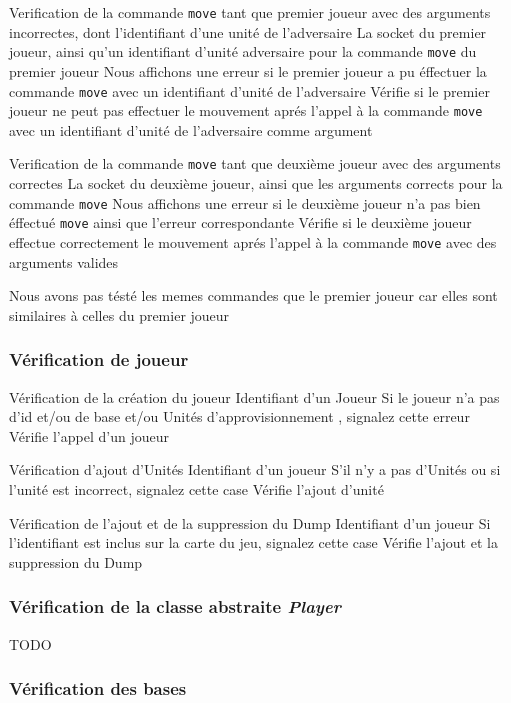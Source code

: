\mytest
{Verification de la commande {\tt move} tant que premier joueur avec des arguments incorrectes, dont l'identifiant d'une unité de l'adversaire}
{La socket du premier joueur, ainsi qu'un identifiant d'unité adversaire pour la commande {\tt move} du premier joueur}
{Nous affichons une erreur si le premier joueur a pu éffectuer la commande {\tt move} avec un identifiant d'unité de l'adversaire}
{Vérifie si le premier joueur ne peut pas effectuer le mouvement aprés l'appel à la commande {\tt move} avec un identifiant d'unité de l'adversaire comme argument}

\mytest
{Verification de la commande {\tt move} tant que deuxième joueur avec des arguments correctes}
{La socket du deuxième joueur, ainsi que les arguments corrects pour la commande {\tt move}}
{Nous affichons une erreur si le deuxième joueur n'a pas bien éffectué {\tt move} ainsi que l'erreur correspondante}
{Vérifie si le deuxième joueur effectue correctement le mouvement aprés l'appel à la commande {\tt move} avec des arguments valides}

Nous avons pas tésté les memes commandes que le premier joueur car elles sont similaires à celles du premier joueur



\subsubsection{Vérification de joueur}

\mytest
{Vérification de la création du joueur }
{Identifiant d'un Joueur}
{Si le joueur n'a pas d'id et/ou de base et/ou Unités d'approvisionnement , signalez cette erreur}
{Vérifie l'appel d'un joueur}


\mytest
{Vérification d'ajout d'Unités }
{Identifiant d'un joueur}
{S'il n'y a pas d'Unités ou si l'unité est incorrect, signalez cette case}
{Vérifie l'ajout d'unité}


\mytest
{Vérification de l'ajout et de la suppression du Dump }
{Identifiant d'un joueur}
{Si l'identifiant est inclus sur la carte du jeu, signalez cette case}
{Vérifie l'ajout et la suppression du Dump}


\subsubsection{Vérification de la classe abstraite \emph{Player}}

TODO

\subsubsection{Vérification des bases}


